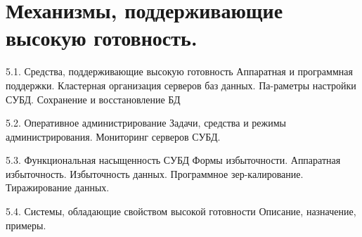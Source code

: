 \section{Механизмы, поддерживающие высокую готовность.}

5.1. Средства, поддерживающие высокую готовность
Аппаратная и программная поддержки. Кластерная организация серверов баз данных. Па-раметры настройки СУБД. Сохранение и восстановление БД

5.2. Оперативное администрирование
Задачи, средства и режимы администрирования. Мониторинг серверов СУБД.

5.3. Функциональная насыщенность СУБД
Формы избыточности. Аппаратная избыточность. Избыточность данных. Программное зер-калирование. Тиражирование данных.

5.4. Системы, обладающие свойством высокой готовности
Описание, назначение, примеры.